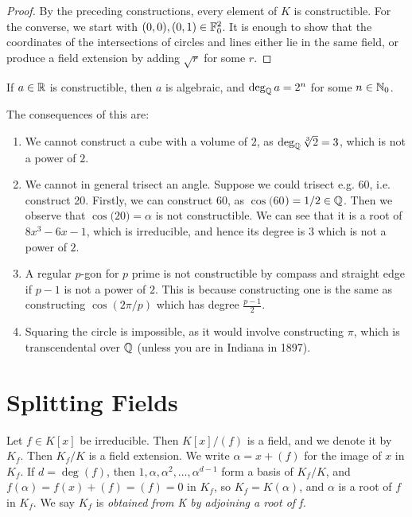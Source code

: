 \documentclass[10pt,a4paper]{article}
\begin{document}
\begin{proof}
By the preceding constructions, every element of $K$ is constructible. For the converse, we start with $(0,0), (0,1) \in \mathbb{F}_0^2$. It is enough to show that the coordinates of the intersections of circles and lines either lie in the same field, or produce a field extension by adding $\sqrt{r}$ for some $r$.
\end{proof}

\begin{corollary}
If $a \in \mathbb{R}$ is constructible, then $a$ is algebraic, and $\deg_{\mathbb{Q}} a = 2^n$ for some $n\in \mathbb{N}_{0}$.
\end{corollary}

The consequences of this are:
\begin{enumerate}
\item We cannot construct a cube with a volume of $2$, as $\deg_{\mathbb{Q}} \sqrt[3]{2} = 3$, which is not a power of $2$.
\item We cannot in general trisect an angle. Suppose we could trisect e.g. 60\textdegree, i.e. construct 20\textdegree. Firstly, we can construct 60\textdegree, as $\cos(60$\textdegree$) = 1/2 \in \mathbb{Q}$. Then we observe that $\cos(20$\textdegree$) = \alpha$ is not constructible. We can see that it is a root of $8x^3 - 6x - 1$, which is irreducible, and hence its degree is $3$ which is not a power of $2$.
\item A regular $p$-gon for $p$ prime is not constructible by compass and straight edge if $p-1$ is not a power of $2$. This is because constructing one is the same as constructing $\cos(2\pi/p)$ which has degree $\frac{p-1}{2}$.
\item Squaring the circle is impossible, as it would involve constructing $\pi$, which is transcendental over $\mathbb{Q}$ (unless you are in Indiana in 1897).
\end{enumerate}
\section{Splitting Fields}
Let $f\in K[x]$ be irreducible. Then $K[x]/(f)$ is a field, and we denote it by $K_f$. Then $K_f/K$ is a field extension. We write $\alpha = x+(f)$ for the image of $x$ in $K_f$. If $d = \deg(f)$, then $1, \alpha, \alpha^2, \ldots, \alpha^{d-1}$ form a basis of $K_f/K$, and $f(\alpha) = f(x) + (f) = (f) = 0$ in $K_f$, so $K_f = K(\alpha)$, and $\alpha$ is a root of $f$ in $K_f$. We say $K_f$ is \emph{obtained from K by adjoining a root of f.}
\end{document}
